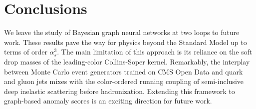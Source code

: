 \section{Conclusions}\label{sec:conclusions}

We leave the study of Bayesian graph neural networks at two loops to
future work. These results pave the way for physics beyond the Standard
Model up to terms of order $\alpha_s^3$. The main limitation of this
approach is its reliance on the soft drop masses of the leading-color
Collins-Soper kernel. Remarkably, the interplay between Monte Carlo
event generators trained on CMS Open Data and quark and gluon jets mixes
with the color-ordered running coupling of semi-inclusive deep inelastic
scattering before hadronization. Extending this framework to graph-based
anomaly scores is an exciting direction for future work.

